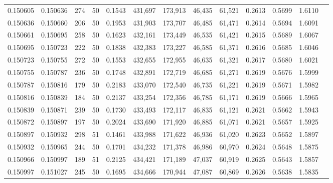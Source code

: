 \begin{tabular}{rrrrrrrrrrrrr}
0.150605 & 0.150636 &   274 &  50 &                                     0.1543 & 431,697 & 173,913 &  46,435 &  61,521 & 0.2613 & 0.5699 & 1.6110 \\
0.150636 & 0.150660 &   206 &  50 &                                     0.1953 & 431,903 & 173,707 &  46,485 &  61,471 & 0.2614 & 0.5694 & 1.6091 \\
0.150661 & 0.150695 &   258 &  50 &                                     0.1623 & 432,161 & 173,449 &  46,535 &  61,421 & 0.2615 & 0.5689 & 1.6067 \\
0.150695 & 0.150723 &   222 &  50 &                                     0.1838 & 432,383 & 173,227 &  46,585 &  61,371 & 0.2616 & 0.5685 & 1.6046 \\
0.150723 & 0.150755 &   272 &  50 &                                     0.1553 & 432,655 & 172,955 &  46,635 &  61,321 & 0.2617 & 0.5680 & 1.6021 \\
0.150755 & 0.150787 &   236 &  50 &                                     0.1748 & 432,891 & 172,719 &  46,685 &  61,271 & 0.2619 & 0.5676 & 1.5999 \\
0.150787 & 0.150816 &   179 &  50 &                                     0.2183 & 433,070 & 172,540 &  46,735 &  61,221 & 0.2619 & 0.5671 & 1.5982 \\
0.150816 & 0.150839 &   184 &  50 &                                     0.2137 & 433,254 & 172,356 &  46,785 &  61,171 & 0.2619 & 0.5666 & 1.5965 \\
0.150839 & 0.150871 &   239 &  50 &                                     0.1730 & 433,493 & 172,117 &  46,835 &  61,121 & 0.2621 & 0.5662 & 1.5943 \\
0.150872 & 0.150897 &   197 &  50 &                                     0.2024 & 433,690 & 171,920 &  46,885 &  61,071 & 0.2621 & 0.5657 & 1.5925 \\
0.150897 & 0.150932 &   298 &  51 &                                     0.1461 & 433,988 & 171,622 &  46,936 &  61,020 & 0.2623 & 0.5652 & 1.5897 \\
0.150932 & 0.150965 &   244 &  50 &                                     0.1701 & 434,232 & 171,378 &  46,986 &  60,970 & 0.2624 & 0.5648 & 1.5875 \\
0.150966 & 0.150997 &   189 &  51 &                                     0.2125 & 434,421 & 171,189 &  47,037 &  60,919 & 0.2625 & 0.5643 & 1.5857 \\
0.150997 & 0.151027 &   245 &  50 &                                     0.1695 & 434,666 & 170,944 &  47,087 &  60,869 & 0.2626 & 0.5638 & 1.5835 \\

\end{tabular}
